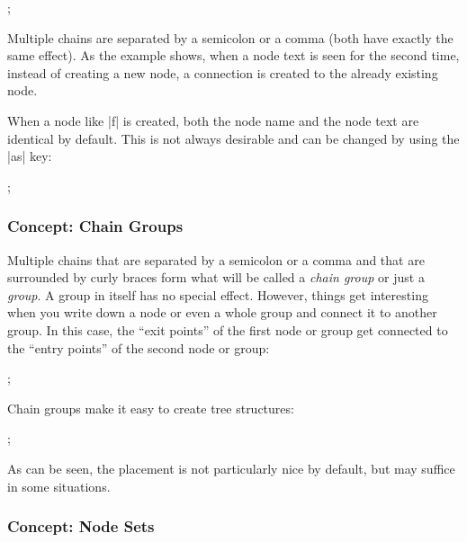 \begin{codeexample}[]
\tikz {};  
\end{codeexample}

Multiple chains are separated by a semicolon or a comma (both have
exactly the same effect). As the example shows, when a node text is
seen for the second time, instead of creating a new node, a connection
is created to the already existing node.

When a node like |f| is created, both the node name and the node text
are identical by default. This is not always desirable and can be
changed by using the |as| key:

\begin{codeexample}[]
\tikz {};  
\end{codeexample}


\subsubsection{Concept: Chain Groups}

Multiple chains that are separated by a semicolon or a comma and that
are surrounded by curly braces form what will be called a \emph{chain
  group} or just a \emph{group}. A group in itself has no special
effect. However, things get interesting when you write down a node or
even a whole group and connect it to another group. In this case, the
``exit points'' of the first node or group get connected to the
``entry points'' of the second node or group:

\begin{codeexample}[]
\tikz {};  
\end{codeexample}

Chain groups make it easy to create tree structures:

\begin{codeexample}[]
\tikz {};
\end{codeexample}

As can be seen, the placement is not particularly nice by default, but
may suffice in some situations.


\subsubsection{Concept: Node Sets}

